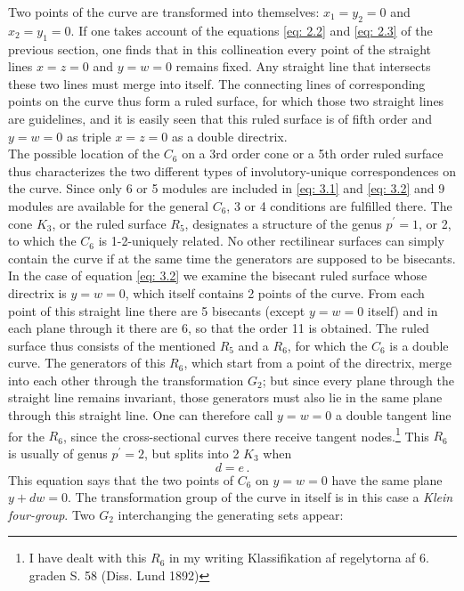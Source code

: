 \documentclass[leqno]{article}
\begin{document}
Two points of the curve are transformed into themselves: $x_1=y_2=0$ and $x_2=y_1=0$. If one takes account of the equations \eqref{eq: 2.2} and \eqref{eq: 2.3} of the previous section, one finds that in this collineation every point of the straight lines $x=z=0$ and $y=w=0$ remains fixed. Any straight line that intersects these two lines must merge into itself. The connecting lines of corresponding points on the curve thus form a ruled surface, for which those two straight lines are guidelines, and it is easily seen that this ruled surface is of fifth order and $y=w=0$ as triple $x=z=0 $ as a double directrix. \\
The possible location of the $C_6$ on a 3rd order cone or a 5th order ruled surface thus characterizes the two different types of involutory-unique correspondences on the curve. Since only 6 or 5 modules are included in \eqref{eq: 3.1} and \eqref{eq: 3.2} and 9 modules are available for the general $C_6$, 3 or 4 conditions are fulfilled there. The cone $K_3$, or the ruled surface $R_5$, designates a structure of the genus $p^\prime=1$, or 2, to which the $C_6$ is 1-2-uniquely related. No other rectilinear surfaces can simply contain the curve if at the same time the generators are supposed to be bisecants. \\
In the case of equation \eqref{eq: 3.2} we examine the bisecant ruled surface whose directrix is $y=w=0$, which itself contains 2 points of the curve. From each point of this straight line there are 5 bisecants (except $y=w=0$ itself) and in each plane through it there are 6, so that the order 11 is obtained. The ruled surface thus consists of the mentioned $R_5$ and a $R_6$, for which the $C_6$ is a double curve. The generators of this $R_6$, which start from a point of the directrix, merge into each other through the transformation $G_2$; but since every plane through the straight line remains invariant, those generators must also lie in the same plane through this straight line. One can therefore call $y=w=0$ a double tangent line for the $R_6$, since the cross-sectional curves there receive tangent nodes.\footnote{I have dealt with this $R_6$ in my writing \guillemotright Klassifikation af regelytorna af 6. graden \guillemotright S. 58 (Diss. Lund 1892)} This $R_6$ is usually of genus $p^\prime=2$, but splits into 2 $K_3$ when 
\begin{equation}\label{eq: 3.3}
d=e \, . \tag{3}
\end{equation}
This equation says that the two points of $C_6$ on $y=w=0$ have the same plane $y+dw=0$. The transformation group of the curve in itself is in this case a \textit{Klein four-group}. Two $G_2$ interchanging the generating sets appear:
\end{document}
